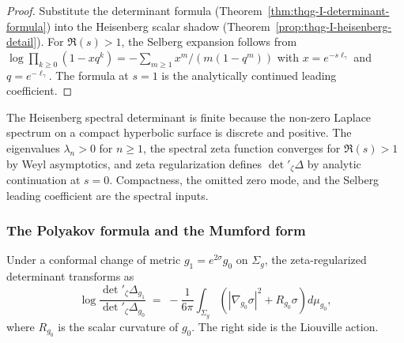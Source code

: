 \begin{proof}
Substitute the determinant formula
(Theorem~\ref{thm:thqg-I-determinant-formula}) into the Heisenberg
scalar shadow (Theorem~\ref{prop:thqg-I-heisenberg-detail}). For
$\Re(s)>1$, the Selberg expansion follows from
$\log\prod_{k\geq0}(1-xq^k)
=-\sum_{m\geq1}x^m/(m(1-q^m))$ with
$x=e^{-s\ell_\gamma}$ and $q=e^{-\ell_\gamma}$. The formula at
$s=1$ is the analytically continued leading coefficient.
\end{proof}

\begin{remark}
The Heisenberg spectral determinant is finite because the non-zero
Laplace spectrum on a compact hyperbolic surface is discrete and
positive. The eigenvalues $\lambda_n>0$ for $n\geq1$, the spectral
zeta function converges for $\Re(s)>1$ by Weyl asymptotics, and
zeta regularization defines $\det{}'_\zeta\Delta$ by analytic
continuation at $s=0$. Compactness, the omitted zero mode, and the
Selberg leading coefficient are the spectral inputs.
\end{remark}

\subsubsection{The Polyakov formula and the Mumford form}

\begin{proposition}
Under a conformal change of metric $g_1 = e^{2\sigma} g_0$ on $\Sigma_g$, the zeta-regularized determinant transforms as
\begin{equation}%
\log\frac{\det{}'_\zeta \Delta_{g_1}}{\det{}'_\zeta \Delta_{g_0}} \;=\; -\frac{1}{6\pi}\int_{\Sigma_g}\left( |\nabla_{g_0}\sigma|^2 + R_{g_0}\sigma \right) d\mu_{g_0},
\end{equation}
where $R_{g_0}$ is the scalar curvature of $g_0$. The right side is the Liouville action.
\end{proposition}

